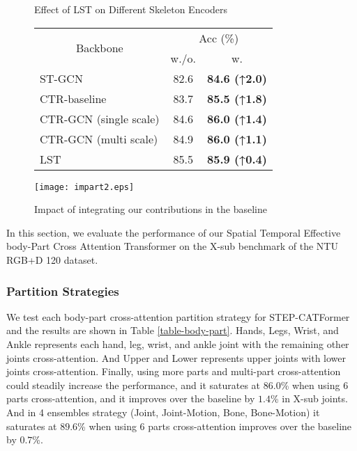 \documentclass{bmvc2k}
\begin{document}
\begin{figure}[h]
  \def\@captype{table}
  \begin{minipage}[]{.4\textwidth}
    \caption{Effect of LST on Different Skeleton Encoders}
    \small
\begin{tabular}{lcc}
\hline
\multicolumn{1}{c}{\multirow{2}{*}{Backbone}} & \multicolumn{2}{c}{Acc (\%)}                                          \\
\multicolumn{1}{c}{}      & \multicolumn{1}{c}{w./o.} & \multicolumn{1}{c}{w.} \\ \hline
\hline
ST-GCN                    & 82.6            & \textbf{84.6 (↑2.0)}         \\
CTR-baseline              & 83.7            & \textbf{85.5 (↑1.8)}         \\
CTR-GCN (single scale)    & 84.6            & \textbf{86.0 (↑1.4)}         \\
CTR-GCN (multi scale)     & 84.9            & \textbf{86.0 (↑1.1)}         \\
LST                       & 85.5            & \textbf{85.9 (↑0.4)}         \\  \hline
\end{tabular}
    \label{table-backbone}
  \end{minipage}
\hfill
\begin{minipage}[]{.43\textwidth}

    \texttt{[image: impart2.eps]}

    \caption{Impact of integrating our contributions in the baseline}
    \label{fig-impart}
  \end{minipage}
\end{figure}


In this section, we evaluate the performance of our Spatial Temporal Effective body-Part Cross Attention Transformer on the X-sub benchmark of the NTU RGB+D 120 dataset. 
\subsubsection*{Partition Strategies}
We test each body-part cross-attention partition strategy for STEP-CATFormer and the results are shown in Table \ref{table-body-part}. Hands, Legs, Wrist, and Ankle represents each hand, leg, wrist, and ankle joint with the remaining other joints cross-attention. And Upper and Lower represents upper joints with lower joints cross-attention. Finally, using more parts and multi-part cross-attention could steadily increase the performance, and it saturates at $ 86.0$\% when using 6 parts cross-attention, and it improves over the baseline by $1.4$\% in X-sub joints. And in 4 ensembles strategy (Joint, Joint-Motion, Bone, Bone-Motion) it saturates at $ 89.6$\% when using 6 parts cross-attention improves over the baseline by $0.7$\%.
\end{document}
